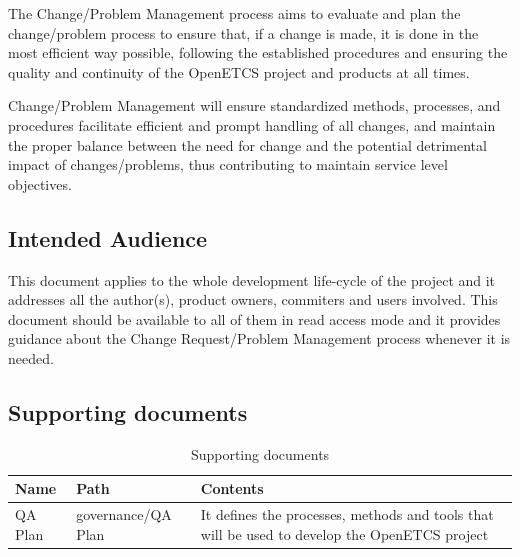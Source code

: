 \documentclass{template/openetcs_article}
\begin{document}
The Change/Problem Management process aims to evaluate and plan the change/problem process to ensure that, if a change is made, it is done in the most efficient way possible, following the established procedures and ensuring the quality and continuity of the OpenETCS project and products at all times.

Change/Problem Management will ensure standardized methods, processes, and procedures facilitate efficient and prompt handling of all changes, and maintain the proper balance between the need for change and
the potential detrimental impact of changes/problems, thus contributing to maintain service level objectives.


\subsection{Intended Audience}
This document applies to the whole development life-cycle of the project and it addresses all the author(s), product owners, commiters and users involved. This document should be available to all of them in read access mode and it provides guidance about the Change Request/Problem Management process whenever it is needed. 

\subsection{Supporting documents}
\begin{table}[H]
\begin{supertabular}{|m{3cm}m{3,5cm}m{7,5cm}|}
\hline {}
Name &
Path &
Contents \\ \hline
QA Plan & governance/QA Plan & It defines the processes, methods and tools that will be used to develop the OpenETCS project
\\\hline
\end{supertabular}
\caption{Supporting documents}
\end{table}
\end{document}
